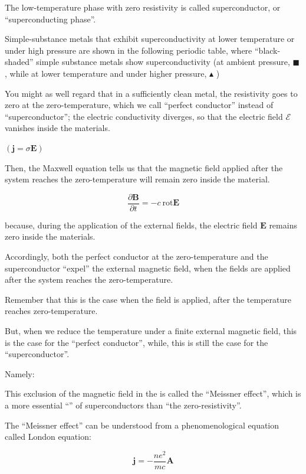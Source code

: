The low-temperature phase with zero resistivity is called superconductor, or ``superconducting phase''. 

Simple-substance metals that exhibit superconductivity at lower temperature or under high pressure are shown in the following periodic table, where ``black-shaded'' simple substance metals show superconductivity (at ambient pressure, $\blacksquare$ , while at lower temperature and under higher pressure, $\blacktriangle$ )

You might as well regard that in a sufficiently clean metal, the resistivity goes to zero at the zero-temperature, which we call ``perfect conductor'' instead of ``superconductor''; the electric conductivity diverges, so that the electric field $\mathscr{E}$ vanishes inside the materials. 

\noindent $(\bm{j} = \sigma \bm{E}) $

Then, the Maxwell equation tells us that the magnetic field {} applied after the system reaches the zero-temperature will remain zero inside the material. 

\[\frac{\partial \bm{B}}{\partial t} = -c\ \text{rot}\bm{E} \]

because, during the application of the external fields, the electric field $\bm{E}$ remains zero inside the materials. 

Accordingly, both the perfect conductor at the zero-temperature and the superconductor ``expel'' the external magnetic field, when the fields are applied {} after the system reaches the zero-temperature. 

Remember that this is the case when the field is applied, after the temperature reaches zero-temperature. 

But, when we reduce the temperature under a finite external magnetic field, this is {} the case for the ``perfect conductor'', while, this is still the case for the ``superconductor''. 

Namely: 

This exclusion of the magnetic field in the {} is called the ``Meissner effect'', which is a more essential ``'' of superconductors than ``the zero-resistivity''. 

The ``Meissner effect'' can be understood from a phenomenological equation called London equation: 

\[\bm{j} = -\frac{ne^2}{mc}\bm{A} \]

